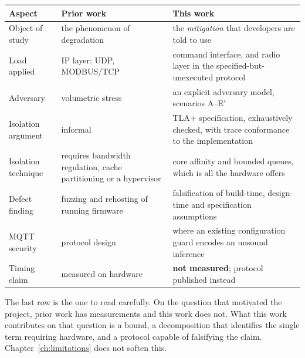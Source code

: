 \begin{longtable}{@{}p{}p{}p{}@{}}
\toprule
\textbf{Aspect} & \textbf{Prior work} & \textbf{This work} \\
\midrule
\endhead
Object of study & the phenomenon of degradation \cite{behnke2020} & the \emph{mitigation} that
developers are told to use \\
Load applied & IP layer: UDP, MODBUS/TCP & command interface, and radio layer in the
specified-but-unexecuted protocol \\
Adversary & volumetric stress & an explicit adversary model, scenarios A--E$'$ \\
Isolation argument & informal & TLA+ specification, exhaustively checked, with trace
conformance to the implementation \\
Isolation technique & requires bandwidth regulation, cache partitioning or a hypervisor
\cite{timingiso2025,mcti2024} & core affinity and bounded queues, which is all the hardware
offers \\
Defect finding & fuzzing and rehosting of running firmware
\cite{pemu2025,sysfuss2026} & falsification of build-time, design-time and specification
assumptions \\
MQTT security & protocol design \cite{amirkhanova2026,mqttl2026} & where an existing
configuration guard encodes an unsound inference \\
Timing claim & measured on hardware & \textbf{not measured}; protocol published instead \\
\bottomrule
\end{longtable}

The last row is the one to read carefully. On the question that motivated the project, prior
work has measurements and this work does not. What this work contributes on that question is a
bound, a decomposition that identifies the single term requiring hardware, and a protocol
capable of falsifying the claim. Chapter~\ref{ch:limitations} does not soften this.
